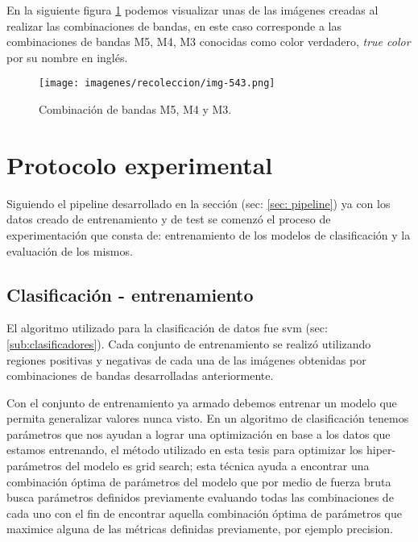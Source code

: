 En la siguiente figura \ref{Fig: bandas543} podemos visualizar unas de las imágenes creadas al realizar las combinaciones de bandas, en este caso corresponde  a las combinaciones de bandas M5, M4, M3 conocidas como color verdadero, \textit{true color} por su nombre en inglés.

\begin{figure}[H]
 \centering
  \texttt{[image: imagenes/recoleccion/img-543.png]}
  \caption{Combinación de bandas M5, M4 y M3.}
	\label{Fig: bandas543}
\end{figure}



\section{Protocolo experimental}\label{sec:entrenamiento}

Siguiendo el pipeline desarrollado en la sección (sec: \ref{sec: pipeline}) ya con los datos creado de entrenamiento y de test se comenzó el proceso de experimentación que consta de: entrenamiento de los modelos de clasificación y la evaluación de los mismos.

\subsection*{Clasificación - entrenamiento}\label{sub:entr_class}

El algoritmo utilizado para la clasificación de datos fue \ac{svm} (sec: \ref{sub:clasificadores}). Cada conjunto de entrenamiento se realizó utilizando regiones positivas y negativas de cada una de las imágenes obtenidas por combinaciones de bandas desarrolladas anteriormente.

Con el conjunto de entrenamiento ya armado debemos entrenar un modelo que permita generalizar valores nunca visto. En un algoritmo  de clasificación tenemos parámetros que nos ayudan a lograr una optimización en base a los datos que estamos entrenando, el método utilizado en esta tesis para optimizar los hiper-parámetros del modelo es grid search; esta técnica ayuda a encontrar una combinación óptima de parámetros del modelo que por medio de fuerza bruta busca parámetros definidos previamente evaluando todas las combinaciones de cada uno con el fin de encontrar aquella combinación óptima de  parámetros que maximice alguna de las métricas definidas previamente, por ejemplo precision. 

